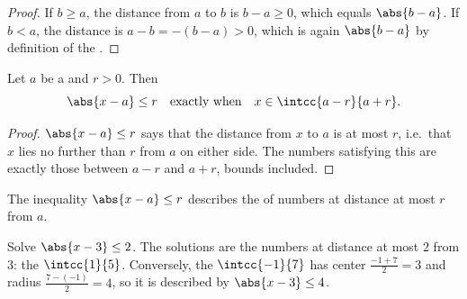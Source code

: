 \begin{proof}
If $b \geq a$, the distance from $a$ to $b$ is $b - a \geq 0$, which
equals $\abs{b-a}$. If $b < a$, the distance is $a - b = -(b - a) > 0$,
which is again $\abs{b - a}$ by definition of the .
\end{proof}

\begin{proposition}\label{prop:g10:numbers:absinterval}
Let $a$ be a  and $r > 0$. Then
\[
\abs{x - a} \leq r
\quad\text{exactly when}\quad
x \in \intcc{a - r}{a + r}.
\]
\end{proposition}

\begin{proof}
$\abs{x-a} \leq r$ says that the distance from $x$ to $a$ is at most $r$,
i.e.\ that $x$ lies no further than $r$ from $a$ on either side. The
numbers satisfying this are exactly those between $a - r$ and $a + r$,
bounds included.
\end{proof}

\begin{omfigure}

{\small The inequality $\abs{x - a} \leq r$ describes the  of
numbers at distance at most $r$ from $a$.}
\end{omfigure}

\begin{example}\label{ex:g10:numbers:abs}
Solve $\abs{x - 3} \leq 2$. The solutions are the numbers at distance at
most $2$ from $3$: the  $\intcc{1}{5}$. Conversely, the 
$\intcc{-1}{7}$ has center $\frac{-1+7}{2} = 3$ and radius
$\frac{7-(-1)}{2} = 4$, so it is described by $\abs{x - 3} \leq 4$.
\end{example}

